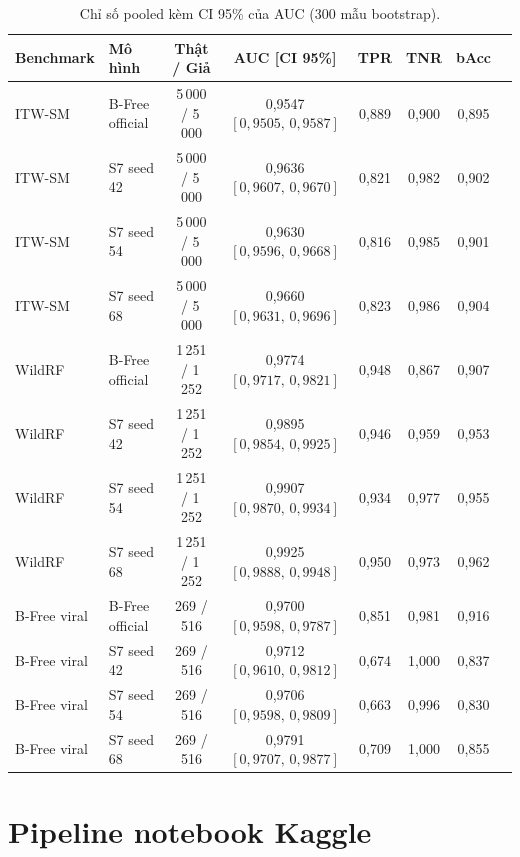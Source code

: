 \documentclass[11pt,a4paper]{article}
\begin{document}
\begin{table}[H]\centering\scriptsize
\caption{Chỉ số pooled kèm CI 95\% của AUC (300 mẫu bootstrap).}
\begin{tabular}{llcccccc}
\toprule
Benchmark & Mô hình & Thật / Giả & AUC [CI 95\%] & TPR & TNR & bAcc \\
\midrule
ITW-SM & B-Free official & 5\,000 / 5\,000 & 0,9547 $[0,9505,\,0,9587]$ & 0,889 & 0,900 & 0,895 \\
ITW-SM & S7 seed 42 & 5\,000 / 5\,000 & 0,9636 $[0,9607,\,0,9670]$ & 0,821 & 0,982 & 0,902 \\
ITW-SM & S7 seed 54 & 5\,000 / 5\,000 & 0,9630 $[0,9596,\,0,9668]$ & 0,816 & 0,985 & 0,901 \\
ITW-SM & S7 seed 68 & 5\,000 / 5\,000 & 0,9660 $[0,9631,\,0,9696]$ & 0,823 & 0,986 & 0,904 \\
\midrule
WildRF & B-Free official & 1\,251 / 1\,252 & 0,9774 $[0,9717,\,0,9821]$ & 0,948 & 0,867 & 0,907 \\
WildRF & S7 seed 42 & 1\,251 / 1\,252 & 0,9895 $[0,9854,\,0,9925]$ & 0,946 & 0,959 & 0,953 \\
WildRF & S7 seed 54 & 1\,251 / 1\,252 & 0,9907 $[0,9870,\,0,9934]$ & 0,934 & 0,977 & 0,955 \\
WildRF & S7 seed 68 & 1\,251 / 1\,252 & 0,9925 $[0,9888,\,0,9948]$ & 0,950 & 0,973 & 0,962 \\
\midrule
B-Free viral & B-Free official & 269 / 516 & 0,9700 $[0,9598,\,0,9787]$ & 0,851 & 0,981 & 0,916 \\
B-Free viral & S7 seed 42 & 269 / 516 & 0,9712 $[0,9610,\,0,9812]$ & 0,674 & 1,000 & 0,837 \\
B-Free viral & S7 seed 54 & 269 / 516 & 0,9706 $[0,9598,\,0,9809]$ & 0,663 & 0,996 & 0,830 \\
B-Free viral & S7 seed 68 & 269 / 516 & 0,9791 $[0,9707,\,0,9877]$ & 0,709 & 1,000 & 0,855 \\
\bottomrule
\end{tabular}
\end{table}

\clearpage
\section{Pipeline notebook Kaggle}
\label{app:notebooks}
\end{document}
